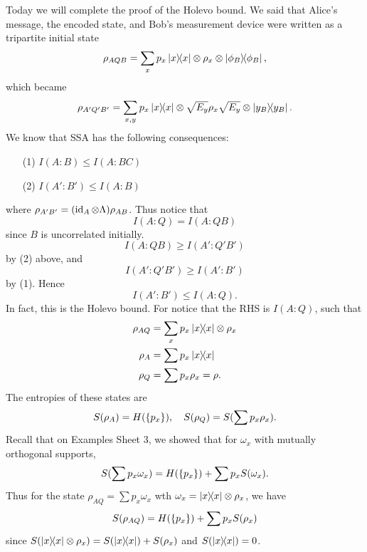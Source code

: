 Today we will complete the proof of the Holevo bound. We said that Alice's message, the encoded state, and Bob's measurement device were written as a tripartite initial state
\begin{equation}
    \rho_{AQB}=\sum_x p_x \left\lvert{x}\middle\rangle\!\middle\langle{x}\right\rvert \otimes \rho_x \otimes \left\lvert{\phi_B}\middle\rangle\!\middle\langle{\phi_B}\right\rvert,
\end{equation}
which became
\begin{equation}
    \rho_{A'Q'B'} = \sum_{x,y} p_x \left\lvert{x}\middle\rangle\!\middle\langle{x}\right\rvert \otimes \sqrt{E_y} \rho_x \sqrt{E_y} \otimes \left\lvert{y_B}\middle\rangle\!\middle\langle{y_B}\right\rvert.
\end{equation}
We know that SSA has the following consequences:
\begin{enumerate}
    \item[(1)] $I(A:B) \leq I(A:BC)$
    \item [(2)] $I(A':B')\leq I(A:B)$
\end{enumerate}
where $\rho_{A'B'}=(\operatorname{id}_A \otimes \Lambda) \rho_{AB}$. Thus notice that
\begin{equation}
    I(A:Q) = I(A:QB)
\end{equation}
since $B$ is uncorrelated initially.
\begin{equation}
    I(A:QB) \geq I(A': Q'B')
\end{equation}
by (2) above, and 
\begin{equation}
    I(A':Q'B') \geq I(A': B')
\end{equation}
by (1). Hence
\begin{equation}
    I(A':B')\leq I(A:Q).
\end{equation}
In fact, this is the Holevo bound. For notice that the RHS is $I(A:Q)$, such that
\begin{align*}
    \rho_{AQ}&= \sum_x p_x \left\lvert{x}\middle\rangle\!\middle\langle{x}\right\rvert \otimes \rho_x\\
    \rho_A &= \sum p_x \left\lvert{x}\middle\rangle\!\middle\langle{x}\right\rvert\\
    \rho_Q &= \sum p_x \rho_x = \rho.
\end{align*}
The entropies of these states are
\begin{equation}
    S(\rho_A) = H(\{p_x\}),\quad S(\rho_Q)=S(\sum p_x \rho_x).
\end{equation}
Recall that on Examples Sheet 3, we showed that for $\omega_x$ with mutually orthogonal supports,
\begin{equation}
    S(\sum p_x \omega_x) = H(\{p_x\}) + \sum p_x S(\omega_x).
\end{equation}
Thus for the state $\rho_{AQ}=\sum p_x \omega_x$ wth $\omega_x=\left\lvert{x}\middle\rangle\!\middle\langle{x}\right\rvert \otimes \rho_x$, we have
\begin{equation}
    S(\rho_{AQ})=H(\{p_x\}) +\sum p_x S(\rho_x)
\end{equation}
since $S(\left\lvert{x}\middle\rangle\!\middle\langle{x}\right\rvert\otimes \rho_x)=S(\left\lvert{x}\middle\rangle\!\middle\langle{x}\right\rvert)+S(\rho_x)$ and $S(\left\lvert{x}\middle\rangle\!\middle\langle{x}\right\rvert)=0$.

